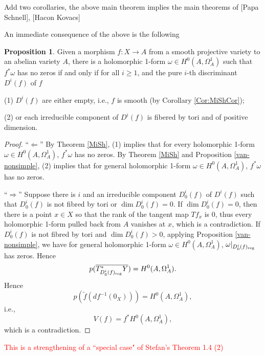 \documentclass[a4paper,12pt,reqno]{amsart}
\theoremstyle{plain}
\theoremstyle{definition}
\newtheorem{proposition}[theorem]{Proposition}
\theoremstyle{remark}
\newcommand{\sorry}[1]{\textcolor{red}{#1}}
\begin{document}
{\color{red} Add two corollaries, the above main theorem implies the main theorems of [Papa Schnell], [Hacon Kovacs]}

An immediate consequence of the above is the
following

\begin{proposition}
Given a morphism $f\colon X\to A$ from a smooth 
projective variety to an abelian variety $A$, there is a holomorphic 1-form $\omega\in H^0(A, \Omega_A^1)$ such that $f^*\omega$ has no zeros if and only
if for all $i\geq1$, and the pure $i$-th discriminant $D^i(f)$ of $f$

(1) $D^i(f)$ are either empty, i.e., $f$ is smooth (by Corollary \ref{Cor:MiShCor});

(2) or each irreducible component of $D^i(f)$ is fibered by tori and of positive dimension. 
\label{thm:nonvanishing}
\end{proposition}

\begin{proof} ``$\Leftarrow$'' By Theorem \ref{MiSh}, (1) implies that for every holomorphic 1-form $\omega\in H^0(A, \Omega_A^1)$, $f^*\omega$ has no zeros. By Theorem \ref{MiSh} and Proposition \ref{van-nonsimple}, (2) implies that for general holomorphic 1-form $\omega\in H^0(A, \Omega_A^1)$, $f^*\omega$ has no zeros.


``$\Rightarrow$'' 
Suppose there is $i$ and an irreducible component $D_0^i(f)$ of $D^i(f)$ such that $D_0^i(f)$ is not fibred by tori or $\dim D_0^i(f)=0$. If $\dim D^i_0(f)=0$, then there is a point $x\in X$ so that the rank of the tangent map $Tf_x$ is 0, thus every holomorphic 1-form pulled back from $A$ vanishes at $x$, which is a contradiction. If $D_0^i(f)$ is not fibred by tori and $\dim D_0^i(f)>0$, applying Proposition \ref{van-nonsimple}, we have for general holomorphic 1-form $\omega\in H^0(A, \Omega_A^1)$, $\omega|_{D_0^i(f)_{\textnormal{reg}}}$ has zeros. Hence $$p(\overline{T^*_{D_0^i(f)_{\textnormal{reg}}}Y})=H^0(A, \Omega_A^1).$$ Hence $$p(\tilde{f}(df^{-1}(0_X)))=H^0(A, \Omega_A^1),$$ i.e.,$$V(f)=f^*H^0(A, \Omega_A^1),$$ which is a contradiction.
\end{proof}

\sorry{This is a strengthening of a ``special case" of Stefan's Theorem 1.4 (2)}


\end{document}
